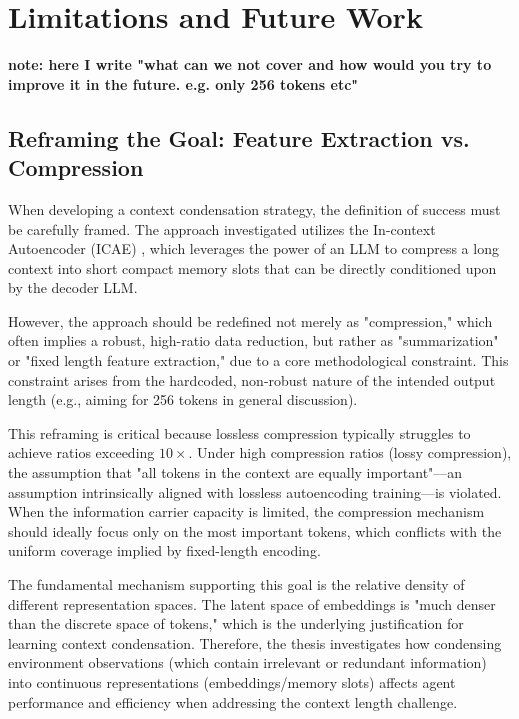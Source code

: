 \chapter{Limitations and Future Work}

\textbf{note: here I write "what can we not cover and how would you try to improve it in the future. e.g. only 256 tokens etc"}

\section{Reframing the Goal: Feature Extraction vs. Compression}

When developing a context condensation strategy, the definition of success must be carefully framed.
The approach investigated utilizes the In-context Autoencoder (ICAE) \cite{ge_-context_2024}, which leverages the power of an LLM to compress a long context into short compact memory slots that can be directly conditioned upon by the decoder LLM.

However, the approach should be redefined not merely as "compression," which often implies a robust, high-ratio data reduction, but rather as "summarization" or "fixed length feature extraction," due to a core methodological constraint.
This constraint arises from the hardcoded, non-robust nature of the intended output length (e.g., aiming for 256 tokens in general discussion).

This reframing is critical because lossless compression typically struggles to achieve ratios exceeding $10\times$.
Under high compression ratios (lossy compression), the assumption that "all tokens in the context are equally important"—an assumption intrinsically aligned with lossless autoencoding training—is violated.
When the information carrier capacity is limited, the compression mechanism should ideally focus only on the most important tokens, which conflicts with the uniform coverage implied by fixed-length encoding.

The fundamental mechanism supporting this goal is the relative density of different representation spaces.
The latent space of embeddings is "much denser than the discrete space of tokens," which is the underlying justification for learning context condensation.
Therefore, the thesis investigates how condensing environment observations (which contain irrelevant or redundant information) into continuous representations (embeddings/memory slots) affects agent performance and efficiency when addressing the context length challenge.


